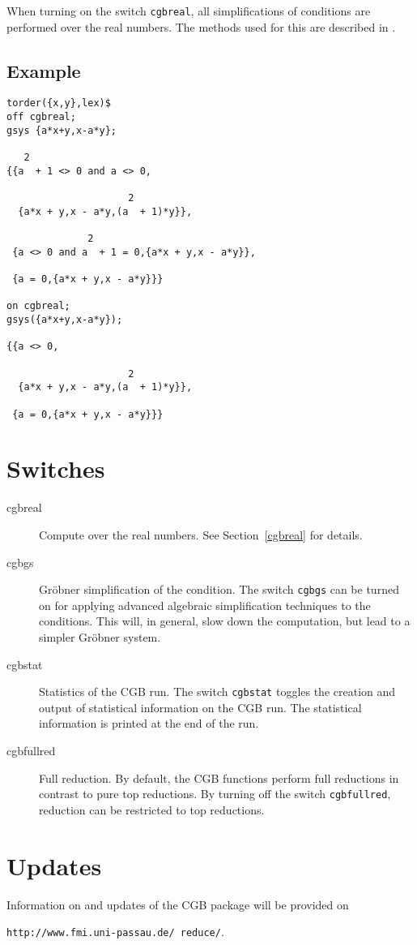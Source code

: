 When turning on the switch {\tt cgbreal}, all simplifications of conditions
are performed over the real numbers. The methods used for this are
described in \cite{DolzmannSturm:97c}.
%
\subsection*{Example}
\begin{verbatim}
torder({x,y},lex)$
off cgbreal;
gsys {a*x+y,x-a*y};

   2
{{a  + 1 <> 0 and a <> 0,

                     2
  {a*x + y,x - a*y,(a  + 1)*y}},

              2
 {a <> 0 and a  + 1 = 0,{a*x + y,x - a*y}},

 {a = 0,{a*x + y,x - a*y}}}

on cgbreal;
gsys({a*x+y,x-a*y});

{{a <> 0,

                     2
  {a*x + y,x - a*y,(a  + 1)*y}},

 {a = 0,{a*x + y,x - a*y}}}
\end{verbatim}

\section{Switches}
\begin{description}
\item[cgbreal] Compute over the real numbers. See
Section~\ref{cgbreal} for details.

\item[cgbgs] Gr\"obner simplification of the condition. The switch
{\tt cgbgs} can be turned on for applying advanced algebraic
simplification techniques to the conditions. This will, in general,
slow down the computation, but lead to a simpler Gr\"obner system.

\item[cgbstat] Statistics of the CGB run. The switch {\tt cgbstat}
toggles the creation and output of statistical information on the CGB
run. The statistical information is printed at the end of the run.

\item[cgbfullred] Full reduction. By default, the CGB functions
perform full reductions in contrast to pure top reductions. By turning
off the switch {\tt cgbfullred}, reduction can be restricted to top
reductions.
\end{description}

\section{Updates}
Information on and updates of the CGB package will be provided on

\centerline{{\tt http://www.fmi.uni-passau.de/ reduce/}.}




